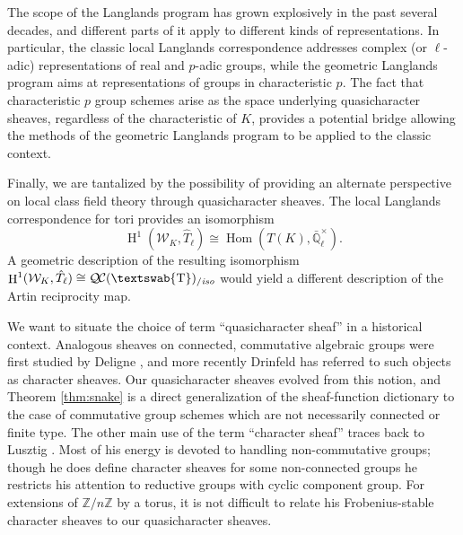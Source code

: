 \documentclass[11pt]{amsart}
\newcommand{\mathswab}[1]{\operatorname{\textswab{#1}}}
\theoremstyle{plain}
\theoremstyle{definition}
\theoremstyle{remark}
\newcommand{\ZZ}{{\mathbb{Z}}}
\newcommand{\EE}{\mathbb{\bar Q}_\ell}
\newcommand{\EEx}{\EE^\times}
\DeclareMathOperator{\Hom}{Hom}
\DeclareMathOperator{\Hh}{H}
\newcommand{\GN}[1]{\mathswab{#1}}
\newcommand{\QC}{{\mathcal{Q\hskip-0.8pt C}}}
\newcommand{\QCiso}[1]{\QC(#1)_{/\textit{iso}}}
\newcommand{\Weil}[1]{\mathcal{W}_{#1}}
\begin{document}
The scope of the Langlands program has grown explosively in the past several decades, and
different parts of it apply to different kinds of representations.  In particular, the classic local Langlands
correspondence addresses complex (or $\ell$-adic) representations of real and $p$-adic groups, while
the geometric Langlands program aims at representations of groups in characteristic $p$.  The fact that
characteristic $p$ group schemes arise as the space underlying quasicharacter sheaves, regardless of
the characteristic of $K$, provides a potential bridge allowing the methods of the geometric Langlands
program to be applied to the classic context.

Finally, we are tantalized by the possibility of providing an alternate perspective on local class field theory
through quasicharacter sheaves.  The local Langlands correspondence for tori provides an isomorphism
\[
\Hh^1(\Weil{K}, \hat{T}_\ell) \cong \Hom(T(K), \EEx).
\]
A geometric description of the resulting isomorphism $\Hh^1(\Weil{K}, \hat{T}_\ell) \cong \QCiso{\GN{T}}$
would yield a different description of the Artin reciprocity map.

We want to situate the choice of term ``quasicharacter sheaf'' in a historical context.
Analogous sheaves on connected, commutative algebraic groups were first studied
by Deligne \cite{deligne:SGA4.5}, and more recently Drinfeld has referred to such objects
as character sheaves.  Our quasicharacter sheaves evolved from this notion, and Theorem \ref{thm:snake}
is a direct generalization of the sheaf-function dictionary to the case of commutative
group schemes which are not necessarily connected or finite type.  The other main use
of the term ``character sheaf'' traces back to Lusztig \cite{}.  Most of his energy is devoted to
handling non-commutative groups; though he does define character sheaves for some
non-connected groups he restricts his attention to reductive groups with cyclic component group.
For extensions of $\ZZ/n\ZZ$ by a torus, it is not difficult to relate his Frobenius-stable character
sheaves to our quasicharacter sheaves.
\end{document}
